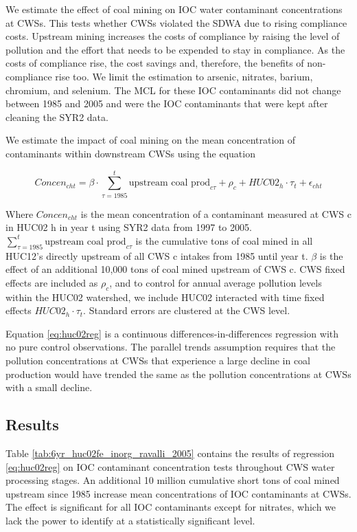 \documentclass{article}
\begin{document}
We estimate the effect of coal mining on IOC water contaminant concentrations at CWSs. This tests whether CWSs violated the SDWA due to rising compliance costs. Upstream mining increases the costs of compliance by raising the level of pollution and the effort that needs to be expended to stay in compliance. As the costs of compliance rise, the cost savings and, therefore, the benefits of non-compliance rise too. We limit the estimation to arsenic, nitrates, barium, chromium, and selenium. The MCL for these IOC contaminants did not change between 1985 and 2005 and were the IOC contaminants that were kept after cleaning the SYR2 data.

We estimate the impact of coal mining on the mean concentration of contaminants within downstream CWSs using the equation

\begin{equation}\label{eq:huc02reg}
    \textit{Concen}_{cht}= \beta\cdot\sum_{\tau=1985}^t\text{upstream coal prod}_{c\tau}  + \rho_c + HUC02_h\cdot\tau_t + \epsilon_{cht}
\end{equation}

Where $\textit{Concen}_{cht}$ is the mean concentration of a contaminant measured at CWS c in HUC02 h in year t using SYR2 data from 1997 to 2005. $\sum_{\tau=1985}^t\text{upstream coal prod}_{c\tau}$ is the cumulative tons of coal mined in all HUC12's directly upstream of all CWS c intakes from 1985 until year t. $\beta$ is the effect of an additional 10,000 tons of coal mined upstream of CWS c. CWS fixed effects are included as $\rho_c$, and to control for annual average pollution levels within the HUC02 watershed, we include HUC02 interacted with time fixed effects $HUC02_h\cdot\tau_t$. Standard errors are clustered at the CWS level.

Equation \ref{eq:huc02reg} is a continuous differences-in-differences regression with no pure control observations. The parallel trends assumption requires that the pollution concentrations at CWSs that experience a large decline in coal production would have trended the same as the pollution concentrations at CWSs with a small decline.

\subsection{Results}



Table \ref{tab:6yr_huc02fe_inorg_ravalli_2005} contains the results of regression \ref{eq:huc02reg} on IOC contaminant concentration tests throughout CWS water processing stages. An additional 10 million cumulative short tons of coal mined upstream since 1985 increase mean concentrations of IOC contaminants at CWSs. The effect is significant for all IOC contaminants except for nitrates, which we lack the power to identify at a statistically significant level.
\end{document}
